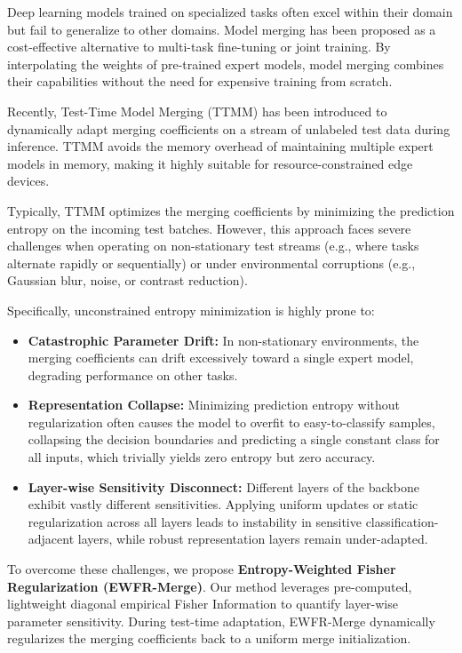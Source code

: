 \documentclass{article}
\theoremstyle{plain}
\theoremstyle{definition}
\theoremstyle{remark}
\begin{document}
Deep learning models trained on specialized tasks often excel within their domain but fail to generalize to other domains. Model merging \cite{adamerging, task_arithmetic} has been proposed as a cost-effective alternative to multi-task fine-tuning or joint training. By interpolating the weights of pre-trained expert models, model merging combines their capabilities without the need for expensive training from scratch.

Recently, Test-Time Model Merging (TTMM) has been introduced to dynamically adapt merging coefficients on a stream of unlabeled test data during inference. TTMM avoids the memory overhead of maintaining multiple expert models in memory, making it highly suitable for resource-constrained edge devices. 

Typically, TTMM optimizes the merging coefficients by minimizing the prediction entropy on the incoming test batches. However, this approach faces severe challenges when operating on non-stationary test streams (e.g., where tasks alternate rapidly or sequentially) or under environmental corruptions (e.g., Gaussian blur, noise, or contrast reduction). 

Specifically, unconstrained entropy minimization is highly prone to:
\begin{itemize}
    \item \textbf{Catastrophic Parameter Drift:} In non-stationary environments, the merging coefficients can drift excessively toward a single expert model, degrading performance on other tasks.
    \item \textbf{Representation Collapse:} Minimizing prediction entropy without regularization often causes the model to overfit to easy-to-classify samples, collapsing the decision boundaries and predicting a single constant class for all inputs, which trivially yields zero entropy but zero accuracy.
    \item \textbf{Layer-wise Sensitivity Disconnect:} Different layers of the backbone exhibit vastly different sensitivities. Applying uniform updates or static regularization across all layers leads to instability in sensitive classification-adjacent layers, while robust representation layers remain under-adapted.
\end{itemize}

To overcome these challenges, we propose \textbf{Entropy-Weighted Fisher Regularization (EWFR-Merge)}. Our method leverages pre-computed, lightweight diagonal empirical Fisher Information to quantify layer-wise parameter sensitivity. During test-time adaptation, EWFR-Merge dynamically regularizes the merging coefficients back to a uniform merge initialization. 
\end{document}
